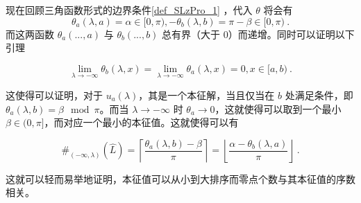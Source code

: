 现在回顾三角函数形式的边界条件\autoref{def_SLzPro_1} ，代入 $\theta$ 将会有
\begin{equation}
\theta_a(\lambda, a) = \alpha\in [0, \pi), -\theta_b(\lambda,  b) = \pi-\beta \in [0,\pi) ~.
\end{equation}
而这两函数 $\theta_a(..., a)$ 与 $\theta_b(..., b)$ 总有界（大于 $0$）而递增。同时可以证明以下引理
\begin{lemma}{}
\begin{equation}
\lim_{\lambda \rightarrow -\infty} \theta_b(\lambda, x) = \lim_{\lambda \rightarrow -\infty} \theta_a(\lambda, x) = 0, x \in [a, b) ~.
\end{equation}

\end{lemma}
这使得可以证明，对于 $u_a(\lambda)$，其是一个本征解，当且仅当在 $b$ 处满足条件，即 $\theta_a(\lambda, b) = \beta \mod \pi$。而当 $\lambda \rightarrow -\infty$ 时 $\theta_a \rightarrow 0$，这就使得可以取到一个最小 $\beta \in (0, \pi]$，而对应一个最小的本征值。这就使得可以有
\begin{theorem}{}
\begin{equation}
\#_{(-\infty, \lambda)}(\hat L) = \left\lceil \frac{\theta_a(\lambda, b) - \beta}{\pi}\right\rceil = \left\lfloor \frac{\alpha - \theta_b(\lambda, a)}{\pi}\right\rfloor~.
\end{equation}

\end{theorem}

这就可以轻而易举地证明，本征值可以从小到大排序而零点个数与其本征值的序数相关。
